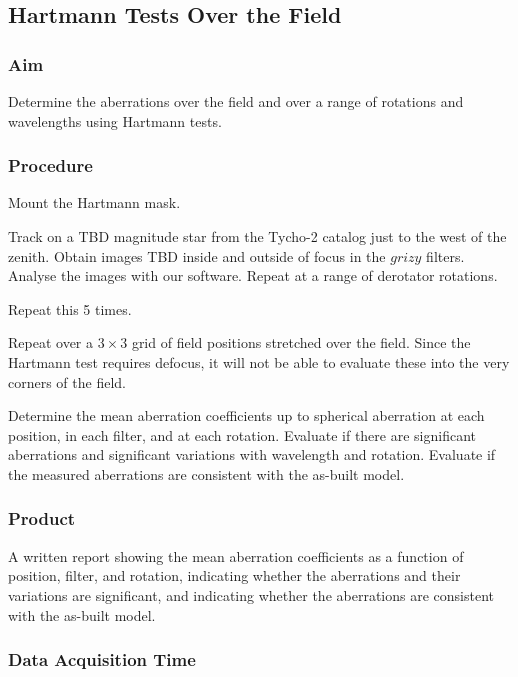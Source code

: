 \documentclass{article}
\begin{document}

\subsection{Hartmann Tests Over the Field}

\subsubsection{Aim}

Determine the aberrations over the field and over a range of rotations and wavelengths using Hartmann tests.

\subsubsection{Procedure}

Mount the Hartmann mask.

Track on a TBD magnitude star from the Tycho-2 catalog just to the west of the zenith. Obtain images TBD inside and outside of focus in the $grizy$ filters. Analyse the images with our software. Repeat at a range of derotator rotations.

Repeat this 5 times.

Repeat over a $3\times3$ grid of field positions stretched over the field. Since the Hartmann test requires defocus, it will not be able to evaluate these into the very corners of the field.

Determine the mean aberration coefficients up to spherical aberration at each position, in each filter, and at each rotation. Evaluate if there are significant aberrations and significant variations with wavelength and rotation. Evaluate if the measured aberrations are consistent with the as-built model.

\subsubsection{Product}

A written report showing the mean aberration coefficients as a function of position, filter, and rotation, indicating whether the aberrations and their variations are significant, and indicating whether the aberrations are consistent with the as-built model. 

\subsubsection{Data Acquisition Time}
\end{document}
